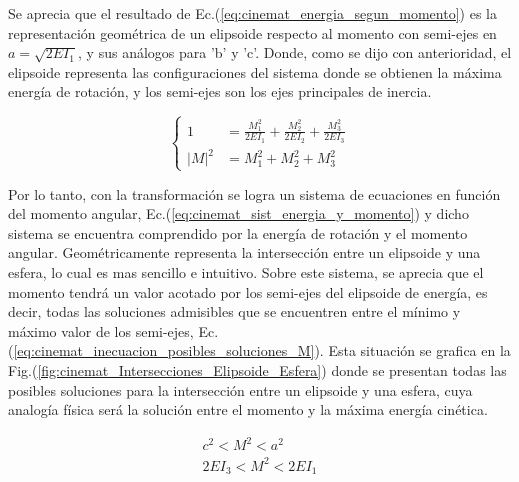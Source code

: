 \documentclass[oneside,a4paper,english,links]{amca}
\begin{document}
Se aprecia que el resultado de Ec.(\ref{eq:cinemat_energia_segun_momento}) es la representaci\'on geom\'etrica de un elipsoide respecto al momento con semi-ejes en $a=\sqrt{2EI_1}$, y sus an\'alogos para 'b' y 'c'. Donde, como se dijo con anterioridad, el elipsoide representa las configuraciones del sistema donde se obtienen la m\'axima energ\'ia de rotaci\'on, y los semi-ejes son los ejes principales de inercia.

\begin{equation}
\begin{cases}
    1&=\frac{M_1^2}{2EI_1}+\frac{M_2^2}{2EI_2}+\frac{M_3^2}{2EI_3}\\
    |M|^2&=M_1^2+M_2^2+M_3^2
    \label{eq:cinemat_sist_energia_y_momento}
\end{cases}
\end{equation}

Por lo tanto, con la transformaci\'on se logra un sistema de ecuaciones en funci\'on del momento angular, Ec.(\ref{eq:cinemat_sist_energia_y_momento}) y dicho sistema se encuentra comprendido por la energ\'ia de rotaci\'on y el momento angular. Geom\'etricamente representa la intersecci\'on entre un elipsoide y una esfera, lo cual es mas sencillo e intuitivo. Sobre este sistema, se aprecia que el momento tendr\'a un valor acotado por los semi-ejes del elipsoide de energ\'ia, es decir, todas las soluciones admisibles que se encuentren entre el m\'inimo y m\'aximo valor de los semi-ejes, Ec.(\ref{eq:cinemat_inecuacion_posibles_soluciones_M}). Esta situaci\'on se grafica en la Fig.(\ref{fig:cinemat_Intersecciones_Elipsoide_Esfera}) donde se presentan todas las posibles soluciones para la intersecci\'on entre un elipsoide y una esfera, cuya analog\'ia f\'isica ser\'a la soluci\'on entre el momento y la m\'axima energ\'ia cin\'etica.

\begin{equation}
\begin{split}
    c^2<M^2<a^2\\
    2EI_3<M^2<2EI_1
\end{split}
\label{eq:cinemat_inecuacion_posibles_soluciones_M}
\end{equation}
\end{document}
